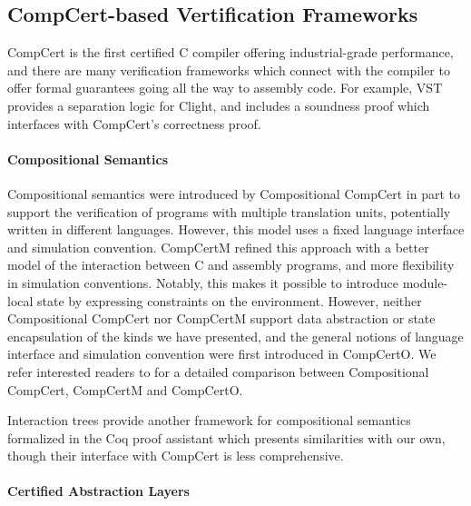 \documentclass[acmsmall,screen,review,anonymous]{acmart}
\begin{document}
\subsection{CompCert-based Vertification Frameworks}

CompCert \cite{compcert}
is the first certified C compiler offering industrial-grade performance,
and there are many verification frameworks which connect with the compiler
to offer formal guarantees going all the way to assembly code.
For example, VST \cite{vst}
provides a separation logic for Clight,
and includes a soundness proof which interfaces with CompCert's correctness proof.

\paragraph{Compositional Semantics}

Compositional semantics were introduced by
Compositional CompCert \cite{compcompcert}
in part to support the verification of
programs with multiple translation units,
potentially written in different languages.
However,
this model uses a fixed language interface and simulation convention.
CompCertM \cite{compcertm} refined this approach
with a better model of the interaction between
C and assembly programs,
and more flexibility in simulation conventions.
Notably,
this makes it possible to introduce module-local state
by expressing constraints on the environment.
However, neither Compositional CompCert nor CompCertM
support data abstraction or state encapsulation
of the kinds we have presented,
and the general notions of
language interface and simulation convention
were first introduced in CompCertO.
We refer interested readers to \citet{compcerto}
for a detailed comparison between Compositional CompCert,
CompCertM and CompCertO.

Interaction trees \cite{itree,itrees} provide
another framework for compositional semantics
formalized in the Coq proof assistant
which presents similarities with our own,
though their interface with CompCert is less comprehensive.

\paragraph{Certified Abstraction Layers}
\end{document}
